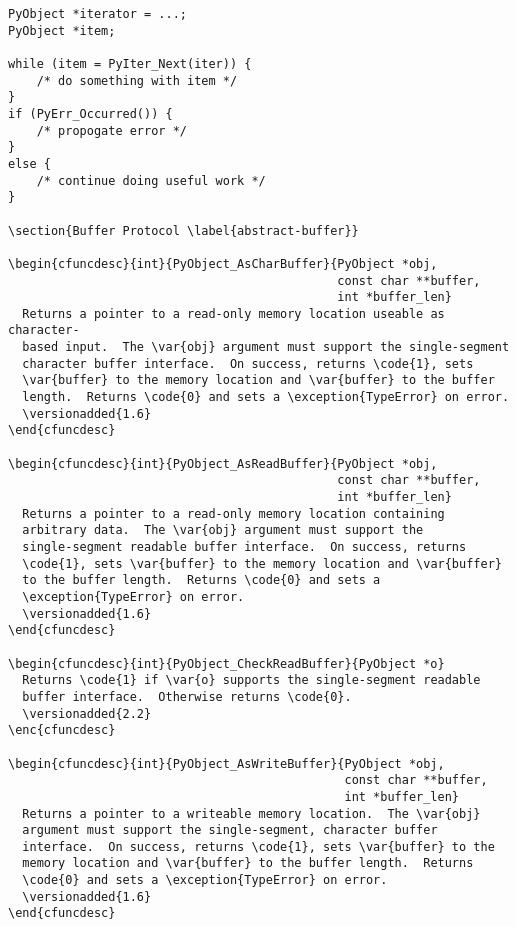 \begin{verbatim}
PyObject *iterator = ...;
PyObject *item;

while (item = PyIter_Next(iter)) {
    /* do something with item */
}
if (PyErr_Occurred()) {
    /* propogate error */
}
else {
    /* continue doing useful work */
}

\section{Buffer Protocol \label{abstract-buffer}}

\begin{cfuncdesc}{int}{PyObject_AsCharBuffer}{PyObject *obj,
                                              const char **buffer,
                                              int *buffer_len}
  Returns a pointer to a read-only memory location useable as character-
  based input.  The \var{obj} argument must support the single-segment
  character buffer interface.  On success, returns \code{1}, sets
  \var{buffer} to the memory location and \var{buffer} to the buffer
  length.  Returns \code{0} and sets a \exception{TypeError} on error.
  \versionadded{1.6}
\end{cfuncdesc}

\begin{cfuncdesc}{int}{PyObject_AsReadBuffer}{PyObject *obj,
                                              const char **buffer,
                                              int *buffer_len}
  Returns a pointer to a read-only memory location containing
  arbitrary data.  The \var{obj} argument must support the
  single-segment readable buffer interface.  On success, returns
  \code{1}, sets \var{buffer} to the memory location and \var{buffer}
  to the buffer length.  Returns \code{0} and sets a
  \exception{TypeError} on error.
  \versionadded{1.6}
\end{cfuncdesc}

\begin{cfuncdesc}{int}{PyObject_CheckReadBuffer}{PyObject *o}
  Returns \code{1} if \var{o} supports the single-segment readable
  buffer interface.  Otherwise returns \code{0}.
  \versionadded{2.2}
\enc{cfuncdesc}

\begin{cfuncdesc}{int}{PyObject_AsWriteBuffer}{PyObject *obj,
                                               const char **buffer,
                                               int *buffer_len}
  Returns a pointer to a writeable memory location.  The \var{obj}
  argument must support the single-segment, character buffer
  interface.  On success, returns \code{1}, sets \var{buffer} to the
  memory location and \var{buffer} to the buffer length.  Returns
  \code{0} and sets a \exception{TypeError} on error.
  \versionadded{1.6}
\end{cfuncdesc}

\end{verbatim}
